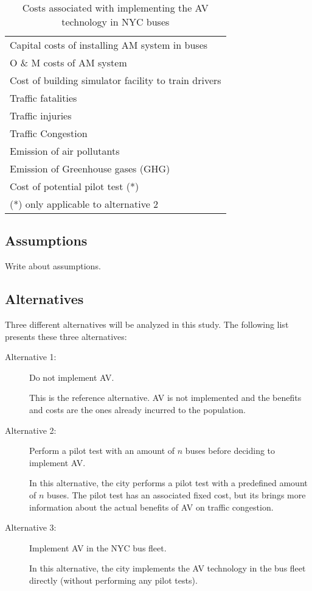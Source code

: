 \documentclass[11pt, letterpaper]{article}
\begin{document}
\begin{table}[h]
\caption{Costs associated with implementing the AV technology in NYC buses}
\begin{center}
\begin{tabular}{l}
\hline\hline
Capital costs of installing AM system in buses\\
O \& M costs of AM system \\
Cost of building simulator facility to train drivers \\
Traffic fatalities \\
Traffic injuries \\
Traffic Congestion \\
Emission of air pollutants \\
Emission of Greenhouse gases (GHG) \\
Cost of potential pilot test (*) \\
\hline\hline
{\footnotesize (*) only applicable to alternative 2}
\end{tabular}
\end{center}
\label{tab:bca.costs}
\end{table}%

\subsection{Assumptions}

Write about assumptions.

\subsection{Alternatives}

Three different alternatives will be analyzed in this study. The following list presents these three alternatives:

\begin{description}%
\item[Alternative 1:] Do not implement AV.

This is the reference alternative. AV is not implemented and the benefits and costs are the ones already incurred to the population.

\item[Alternative 2:] Perform a pilot test with an amount of $n$ buses before deciding to implement AV.

In this alternative, the city performs a pilot test with a predefined amount of $n$ buses. The pilot test has an associated fixed cost, but its brings more information about the actual benefits of AV on traffic congestion. 

\item[Alternative 3:] Implement AV in the NYC bus fleet.

In this alternative, the city implements the AV technology in the bus fleet directly (without performing any pilot tests).

\end{description}
\end{document}
